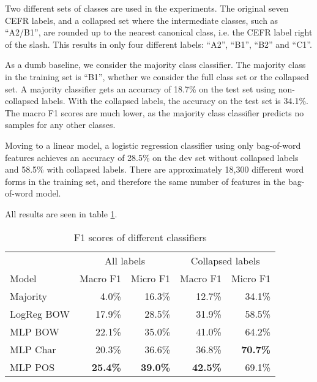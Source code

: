 Two different sets of classes are used in the experiments. The original seven
CEFR labels, and a collapsed set where the intermediate classes, such as
``A2/B1'', are rounded up to the nearest canonical class, i.e. the CEFR label
right of the slash. This results in only four different labels: ``A2'',
``B1'', ``B2'' and ``C1''.

As a dumb baseline, we consider the majority class classifier. The majority
class in the training set is ``B1'', whether we consider the full class set
or the collapsed set. A majority classifier gets an accuracy of 18.7\% on the
test set using non-collapsed labels. With the collapsed labels, the accuracy
on the test set is 34.1\%. The macro F1 scores are much lower, as the
majority class classifier predicts no samples for any other classes.

Moving to a linear model, a logistic regression classifier using only
bag-of-word features achieves an accuracy of 28.5\% on the dev set without
collapsed labels and 58.5\% with collapsed labels. There are approximately
18,300 different word forms in the training set, and therefore the same
number of features in the bag-of-word model.

All results are seen in table \ref{baseline-accuracies}.

\begin{table}
  \centering
  \begin{tabular}{|l|rr|rr|}
    \toprule
             & \multicolumn{2}{c|}{All labels} & \multicolumn{2}{c|}{Collapsed labels} \\
    Model      & Macro F1        & Micro F1        & Macro F1        & Micro F1       \\
    \midrule
    Majority   &          4.0\%  &         16.3\%  &         12.7\%  &         34.1\% \\
    LogReg BOW &         17.9\%  &         28.5\%  &         31.9\%  &         58.5\% \\
    MLP BOW    &         22.1\%  &         35.0\%  &         41.0\%  &         64.2\% \\
    MLP Char   &         20.3\%  &         36.6\%  &         36.8\%  & \textbf{70.7\%} \\
    MLP POS    & \textbf{25.4\%} & \textbf{39.0\%} & \textbf{42.5\%} &         69.1\% \\
    \bottomrule
  \end{tabular}
  \caption{F1 scores of different classifiers}
  \label{baseline-accuracies}
\end{table}

